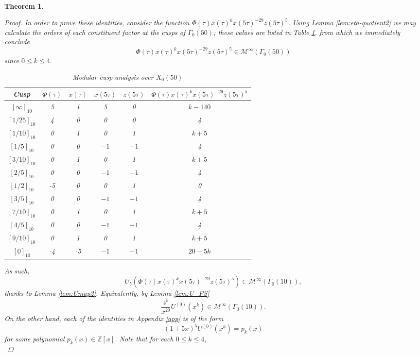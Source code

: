 \documentclass[12pt, reqno]{amsart}
\newtheorem{thm}{Theorem}[section]
\theoremstyle{definition}
\theoremstyle{remark}
\begin{document}
\begin{thm}
\begin{proof}
In order to prove these identities, consider the function $\Phi(\tau) x(\tau)^k x(5\tau)^{-29} z(5\tau)^5$. Using Lemma \ref{lem:eta-quotient2} we may calculate the orders of each constituent factor at the cusps of $\Gamma_0(50)$; these values are listed in Table \ref{tab:cusps}, from which we immediately conclude
\[\Phi(\tau) x(\tau)^k x(5\tau)^{-29} z(5\tau)^5 \in \mathcal{M}^\infty(\Gamma_0(50))\]
since $0 \leq k \leq 4.$ 
\begin{table}
\begin{center}
\begin{tabular}{|c||c|c|c|c||c|}
\hline
Cusp & $\Phi(\tau)$ & $x(\tau)$ & $x(5\tau)$ & $z(5\tau)$ & $\Phi(\tau) x(\tau)^k x(5\tau)^{-29} z(5\tau)^5$ \\ \hline
$[\infty]_{10}$ & 5 & 1 & 5 & 0 & $k-140$ \\ 
$[1/25]_{10}$ & 4 & 0 & 0 & 0 & 4 \\
$[1/10]_{10}$ & 0 & 1 & 0 & 1 & $k+5$ \\
$[1/5]_{10}$ & 0 & 0 & $-1$ & $-1$ & 4 \\
$[3/10]_{10}$ & 0 & 1 & 0 & 1 & $k+5$ \\
$[2/5]_{10}$ & 0 & 0 & $-1$ & $-1$ & 4 \\
$[1/2]_{10}$ & -5 & 0 & 0 & 1 & 0 \\
$[3/5]_{10}$ & 0 & 0 & $-1$ & $-1$ & 4 \\
$[7/10]_{10}$ & 0 & 1 & 0 & 1 & $k+5$ \\
$[4/5]_{10}$ & 0 & 0 & $-1$ & $-1$ & 4 \\
$[9/10]_{10}$ & 0 & 1 & 0 & 1 & $k+5$ \\
$[0]_{10}$ & -4 & -5 & $-1$ & $-1$ & $20-5k$ \\ \hline
\end{tabular}
\caption{\label{tab:cusps}Modular cusp analysis over $X_0(50)$}
\end{center}
\end{table}
As such, 
\[U_5\left(\Phi(\tau) x(\tau)^k x(5\tau)^{-29} z(5\tau)^5\right) \in \mathcal{M}^\infty(\Gamma_0(10)),\] 
thanks to Lemma \ref{lem:Umap2}. Equivalently, by Lemma \ref{lem:U_PS}
\begin{equation}\label{eq:modfx1}
\frac{z^5}{x^{29}} U^{(0)}(x^k) \in \mathcal{M}^\infty(\Gamma_0(10)).
\end{equation}
On the other hand, each of the identities in Appendix \ref{app} is of the form
\[(1+5x)^5 U^{(0)}(x^k) = p_{k}(x)\]
for some polynomial $p_k(x) \in \mathbb{Z}[x]$. Note that for each $0 \leq k \leq 4,$ 
\begin{equation}\label{eq:modfx2}

\end{equation}
\end{proof}
\end{thm}
\end{document}
